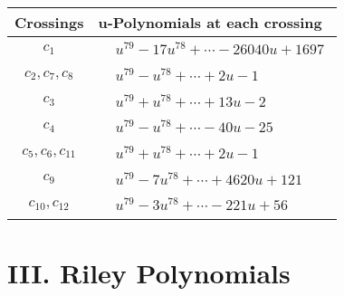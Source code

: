 \documentclass[1p]{elsarticle_modified}
\theoremstyle{definition}
\begin{document}
\begin{tabular}{m{50pt}|m{274pt}}
Crossings & \hspace{64pt}u-Polynomials at each crossing \\
\hline $$\begin{aligned}c_{1}\end{aligned}$$&$\begin{aligned}
&u^{79}-17 u^{78}+\cdots-26040 u+1697
\end{aligned}$\\
\hline $$\begin{aligned}c_{2},c_{7},c_{8}\end{aligned}$$&$\begin{aligned}
&u^{79}- u^{78}+\cdots+2 u-1
\end{aligned}$\\
\hline $$\begin{aligned}c_{3}\end{aligned}$$&$\begin{aligned}
&u^{79}+u^{78}+\cdots+13 u-2
\end{aligned}$\\
\hline $$\begin{aligned}c_{4}\end{aligned}$$&$\begin{aligned}
&u^{79}- u^{78}+\cdots-40 u-25
\end{aligned}$\\
\hline $$\begin{aligned}c_{5},c_{6},c_{11}\end{aligned}$$&$\begin{aligned}
&u^{79}+u^{78}+\cdots+2 u-1
\end{aligned}$\\
\hline $$\begin{aligned}c_{9}\end{aligned}$$&$\begin{aligned}
&u^{79}-7 u^{78}+\cdots+4620 u+121
\end{aligned}$\\
\hline $$\begin{aligned}c_{10},c_{12}\end{aligned}$$&$\begin{aligned}
&u^{79}-3 u^{78}+\cdots-221 u+56
\end{aligned}$\\
\hline
\end{tabular}\newpage\renewcommand{\arraystretch}{1}
\centering \section*{ III. Riley Polynomials}
\end{document}
